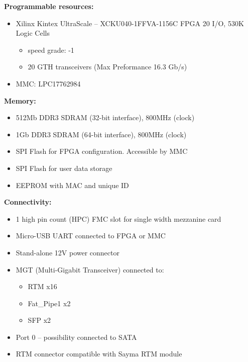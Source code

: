 \textbf{Programmable resources:}

\begin{itemize}
	\item Xilinx Kintex UltraScale – XCKU040-1FFVA-1156C    FPGA 20 I/O, 530K
	Logic Cells
	\begin{itemize}
		\item speed grade: -1
		\item 20 GTH transceivers (Max Preformance 16.3 Gb/s)
	\end{itemize}
	\item MMC: LPC17762984
\end{itemize}	

\textbf{Memory:}

\begin{itemize}
	\item 512Mb  DDR3 SDRAM (32-bit interface), 800MHz (clock)
	\item 1Gb  DDR3 SDRAM (64-bit interface), 800MHz (clock)
	\item SPI Flash for FPGA configuration. Accessible by MMC
	\item SPI Flash for user data storage
	\item EEPROM with MAC and unique ID 
	
\end{itemize}

\textbf{Connectivity:}

\begin{itemize}
	\item 1 high pin count (HPC) FMC slot for single width mezzanine card
	\item Micro-USB UART connected to FPGA or MMC
	\item Stand-alone 12V power connector 
	\item MGT (Multi-Gigabit Transceiver) connected to:
	\begin{itemize}
		\item RTM x16
		\item Fat\_Pipe1 x2
		\item SFP x2
	\end{itemize}
	\item  Port 0 – possibility connected to SATA
	\item RTM connector compatible with Sayma RTM module
	
\end{itemize}

